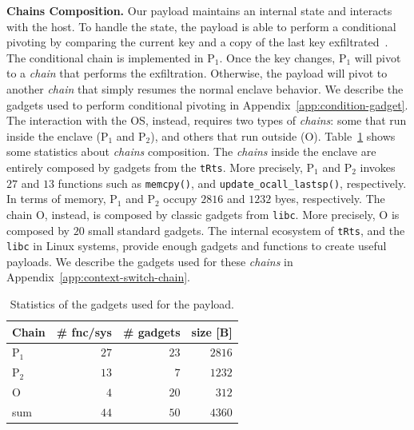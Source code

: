 \textbf{Chains Composition.}
\label{ssec:chain-composition}
Our payload maintains an internal state and interacts with the 
host.
To handle the state, the payload is able to perform a conditional pivoting
by comparing the current key and a copy of the last key 
exfiltrated~\citep{geometry2007}.
The conditional chain is implemented in P$_1$.
Once the key changes, P$_1$ will pivot to a \emph{chain} that performs the 
exfiltration. Otherwise, the payload will pivot to 
another \emph{chain} that simply resumes the normal enclave behavior.
We describe the gadgets used to perform conditional pivoting in 
Appendix~\ref{app:condition-gadget}.
The interaction with the OS, instead, requires two types of \emph{chains}: some 
that run inside the enclave (\ie P$_1$ and P$_2$), and others that run outside
(\ie O).
Table~\ref{tbl:gadgets} shows some statistics about \emph{chains} composition.
The \emph{chains} inside the enclave are entirely composed by gadgets from the 
\texttt{tRts}.
More precisely, P$_1$ and P$_2$ invokes $27$ and $13$ functions such as 
\texttt{memcpy()}, and \texttt{update\_ocall\_lastsp()}, respectively.
In terms of memory, P$_1$ and P$_2$ occupy $2816$ and $1232$ byes, 
respectively.
The chain O, instead, is composed by classic gadgets from \texttt{libc}.
More precisely, O is composed by $20$ small standard gadgets. 
The internal ecosystem of \texttt{tRts}, and the \texttt{libc} in Linux 
systems, provide
enough gadgets and functions to create useful payloads.
We describe the gadgets used for these \emph{chains} in 
Appendix~\ref{app:context-switch-chain}.

\begin{table}[t]
	\centering
	\begin{tabular}{lrrr}
		\toprule
		Chain & \multicolumn{1}{l}{\# fnc/sys} & \multicolumn{1}{l}{\# gadgets} 
		& \multicolumn{1}{l}{size [B]} 
		\\ \midrule
		P$_1$    & $27$ & $23$ & $2816$ \\
		P$_2$    & $13$ &  $7$ & $1232$ \\
		O     	 & $4$ &  $20$ & $312$ \\ \midrule
		sum   	 & $44$ &  $50$ & $4360$ \\ \bottomrule
	\end{tabular}
	\caption{Statistics of the gadgets used for the payload.}
	\label{tbl:gadgets}
\end{table}

